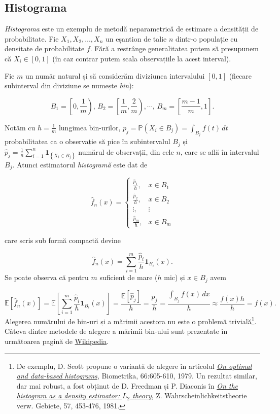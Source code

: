 \documentclass[]{article}
\let\rmarkdownfootnote\footnote%
\def\footnote{\protect\rmarkdownfootnote}
\begin{document}
\subsection{Histograma}\label{histograma}

\emph{Histograma} este un exemplu de metodă neparametrică de estimare a
densității de probabilitate. Fie \(X_1, X_2, \ldots, X_n\) un eșantion
de talie \(n\) dintr-o populație cu densitate de probabilitate \(f\).
Fără a restrânge generalitatea putem să presupunem că \(X_i\in[0,1]\)
(în caz contrar putem scala observațiile la acest interval).

Fie \(m\) un număr natural și să considerăm diviziunea intervalului
\([0,1]\) (fiecare subinterval din diviziune se numește \emph{bin}):

\[
  B_1 = \left[0, \frac{1}{m}\right), \, B_2 = \left[\frac{1}{m}, \frac{2}{m}\right),\cdots,\, B_m = \left[\frac{m-1}{m}, 1\right].
\]

Notăm cu \(h = \frac{1}{m}\) lungimea bin-urilor,
\(p_j = \mathbb{P}(X_i\in B_j) = \int_{B_j}f(t)\,dt\) probabilitatea ca
o observație să pice în subintervalul \(B_j\) și
\(\hat{p}_j = \frac{1}{n}\sum_{i = 1}^{n}\mathbf{1}_{\left\{X_i \in B_j\right\}}\)
numărul de observații, din cele \(n\), care se află în intervalul
\(B_j\). Atunci estimatorul \emph{histogramă} este dat de

\[
  \hat{f}_n(x) = \left\{\begin{array}{llll}
            \frac{\hat{p}_1}{h}, & x\in B_1\\
            \frac{\hat{p}_2}{h}, & x\in B_2\\
            \vdots, & \vdots\\
            \frac{\hat{p}_m}{h}, & x\in B_m
  \end{array}\right.
\]

care scris sub formă compactă devine

\[
  \hat{f}_n(x) = \sum_{i=1}^{m} \frac{\hat{p}_i}{h} \mathbf{1}_{B_i}(x).
\] Se poate observa că pentru \(m\) suficient de mare (\(h\) mic) și
\(x\in B_j\) avem

\[
  \mathbb{E}\left[\hat{f}_n(x)\right] = \mathbb{E}\left[\sum_{i=1}^{m} \frac{\hat{p}_i}{h} \mathbf{1}_{B_i}(x)\right]= \frac{\mathbb{E}\left[\hat{p}_j\right]}{h} = \frac{p_j}{h} = \frac{\int_{B_j}f(x)\,dx}{h}\approx \frac{f(x)h}{h} = f(x).
\] Alegerea numărului de bin-uri și a mărimii acestora nu este o
problemă trivială\footnote{De exemplu, D. Scott propune o variantă de
  alegere în articolul \href{readings/histo-bin-size-scott.pdf}{\emph{On
  optimal and data-based histograms}}, Biometrika, 66:605-610, 1979. Un
  rezultat similar, dar mai robust, a fost obținut de D. Freedman și P.
  Diaconis în \href{readings/FreedmanDiaconis1_1981.pdf}{\emph{On the
  histogram as a density estimator: \(L_2\) theory}}, Z.
  Wahrscheinlichkeitstheorie verw. Gebiete, 57, 453-476, 1981.}. Câteva
dintre metodele de alegere a mărimii bin-ului sunt prezentate în
următoarea pagină de
\href{https://en.wikipedia.org/wiki/Histogram\#Number_of_bins_and_width}{Wikipedia}.
\end{document}
